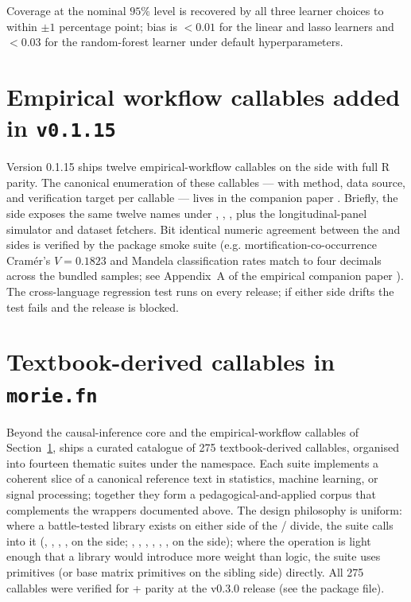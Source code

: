 \documentclass[article,shortnames,nojss]{jss}
\begin{document}
Coverage at the nominal $95\%$ level is recovered by all three
learner choices to within $\pm 1$ percentage point; bias is
$<0.01$ for the linear and lasso learners and $<0.03$ for the
random-forest learner under default hyperparameters.

\section[Empirical workflow callables added in v0.1.15]{Empirical workflow callables added in \texttt{v0.1.15}}\label{sec:mrm-empirical-callables}

Version 0.1.15 ships twelve empirical-workflow callables on
the  side with full R parity.  The canonical
enumeration of these callables --- with method, data source,
and verification target per callable --- lives in the
companion  paper \citep[Section 8]{Ruhela2026MorieR}.
Briefly, the  side exposes the same
twelve names under ,
, , plus
the longitudinal-panel simulator and dataset fetchers.  Bit
identical numeric agreement between the  and
 sides is verified by the package smoke
suite (e.g. mortification-co-occurrence Cramér's $V=0.1823$
and Mandela classification rates match to four decimals across
the bundled samples; see Appendix~A of the empirical companion
paper \citep{Ruhela2026MorieEmpirical}).  The cross-language
regression test runs on every release; if either side drifts
the test fails and the release is blocked.

\section[Textbook-derived callables in morie.fn]{Textbook-derived callables in \texttt{morie.fn}}\label{sec:textbook-callables}

Beyond the causal-inference core and the empirical-workflow
callables of Section~\ref{sec:mrm-empirical-callables},
 ships a curated catalogue of 275 textbook-derived
callables, organised into fourteen thematic suites under the
 namespace.  Each suite implements a coherent
slice of a canonical reference text in statistics, machine
learning, or signal processing; together they form a
pedagogical-and-applied corpus that complements the wrappers
documented above.  The design philosophy is uniform: where a
battle-tested library exists on either side of the
/ divide, the suite calls into it
(, , ,
,  on the  side;
, , , ,
, ,  on the
 side); where the operation is light enough that a
library would introduce more weight than logic, the suite uses
 primitives (or base  matrix
primitives on the sibling side) directly.  All 275 callables
were verified for  +  parity at the
v0.3.0 release (see the package  file).
\end{document}
